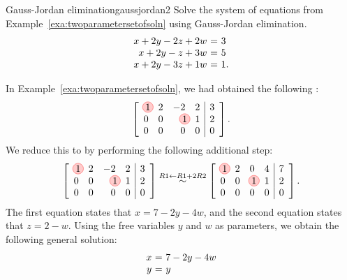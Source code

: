 \begin{example}{Gauss-Jordan elimination}{gaussjordan2}
  Solve the system of equations from
  Example~\ref{exa:twoparametersetofsoln} using Gauss-Jordan
  elimination.
  \begin{equation*}
    \begin{array}{r@{~}c@{~}l}
      x +2y  -2z  +2w &=& 3 \\
      x +2y  -z   +3w &=& 5 \\
      x +2y  -3z  +1w &=& 1.
    \end{array}
  \end{equation*}    
\end{example}

\begin{solution}
  In Example~\ref{exa:twoparametersetofsoln}, we had obtained the
  following {\ef}:
  \begin{equation*}
    \leftB
    \begin{array}{rrrr|r}
      \circled{1} & 2 & -2 & 2 & 3 \\
      0 & 0 & \circled{1} & 1 & 2 \\
      0 & 0 & 0 & 0 & 0
    \end{array}
    \rightB.
  \end{equation*}
  We reduce this to {\rref} by performing the following additional
  step:
  \begin{equation*}
    \leftB
    \begin{array}{rrrr|r}
      \circled{1} & 2 & -2 & 2 & 3 \\
      0 & 0 & \circled{1} & 1 & 2 \\
      0 & 0 & 0 & 0 & 0
    \end{array}
    \rightB
    \stackrel{R1\leftarrow R1+2R2}{\sim}
    \leftB
    \begin{array}{rrrr|r}
      \circled{1} & 2 & 0 & 4 & 7 \\
      0 & 0 & \circled{1} & 1 & 2 \\
      0 & 0 & 0 & 0 & 0
    \end{array}
    \rightB.
  \end{equation*}
  The first equation states that $x=7-2y-4w$, and the second equation
  states that $z=2-w$. Using the free variables $y$ and $w$ as
  parameters, we obtain the following general solution:
  \begin{equation*}
    \begin{array}{r@{~}c@{~}l}
      x &=& 7-2y-4w \\
      y &=& y \\

\end{array}
\end{equation*}
\end{solution}
